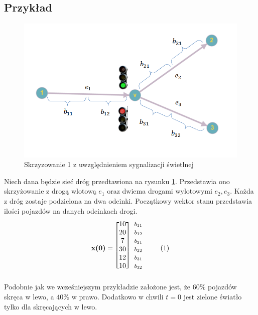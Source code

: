 \documentclass[12pt]{book}
\theoremstyle{plain}
\newcommand\addtag{\refstepcounter{equation}
\renewcommand{\labelenumii}{\theenumii}
\renewcommand{\theenumii}{\theenumi.\arabic{enumii}.}
\tag{\theequation}}
\begin{document}
\subsection{Przykład}
\begin{figure}[H]
	\centering
	\includegraphics[width=14cm]{skrz_1_swiatla_dwa_podzialy}
	\caption{Skrzyzowanie 1 z uwzględnieniem sygnalizacji świetlnej}
	\label{fig:skrz_1_swiatla}
\end{figure}
Niech dana będzie sieć dróg przedtawiona na rysunku \ref{fig:skrz_1_swiatla}. Przedstawia ono skrzyżowanie z drogą wlotową $e_1$ oraz dwiema drogami wylotowymi $e_2,e_3$. Każda z dróg zostaje podzielona na dwa odcinki. Początkowy wektor stanu przedstawia ilości pojazdów na danych odcinkach drogi.
\begin{equation*}
\textbf{x(0)}=
\begin{blockarray}{*{1}{c} l}
\begin{block}{*{1}{>{$\footnotesize}c<{$}} l}
\end{block}
\begin{block}{[*{1}{c}]>{$\footnotesize}l<{$}}
10 &  $b_{11}$ \\
20 &  $b_{12}$ \\
7 &  $b_{21}$ \\
30 &  $b_{22}$ \\
12 &  $b_{31}$ \\
10 &  $b_{32}$ \\
\end{block}
\end{blockarray} \addtag
\end{equation*}
Podobnie jak we wcześniejszym przykładzie założone jest, że $60\%$ pojazdów skręca w lewo, a $40\%$ w prawo. Dodatkowo w chwili $t=0$ jest zielone światło tylko dla skręcających w lewo.
\end{document}
